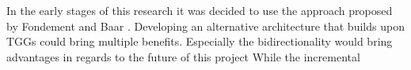 In the early stages of this research it was decided to use the approach proposed by Fondement and Baar \cite{fondement_making_2005}. Developing an alternative architecture that builds upon TGGs could bring multiple benefits. Especially the bidirectionality would bring advantages in regards to the future of this project While the incremental 




